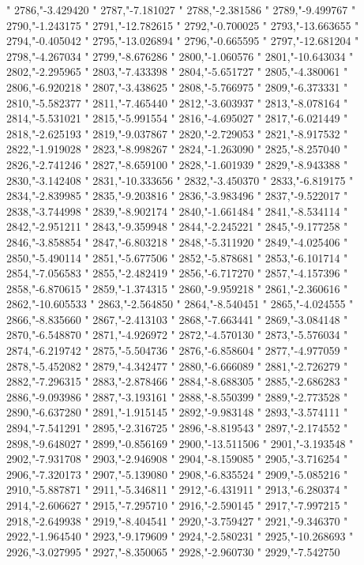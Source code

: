 "
2786,"-3.429420
"
2787,"-7.181027
"
2788,"-2.381586
"
2789,"-9.499767
"
2790,"-1.243175
"
2791,"-12.782615
"
2792,"-0.700025
"
2793,"-13.663655
"
2794,"-0.405042
"
2795,"-13.026894
"
2796,"-0.665595
"
2797,"-12.681204
"
2798,"-4.267034
"
2799,"-8.676286
"
2800,"-1.060576
"
2801,"-10.643034
"
2802,"-2.295965
"
2803,"-7.433398
"
2804,"-5.651727
"
2805,"-4.380061
"
2806,"-6.920218
"
2807,"-3.438625
"
2808,"-5.766975
"
2809,"-6.373331
"
2810,"-5.582377
"
2811,"-7.465440
"
2812,"-3.603937
"
2813,"-8.078164
"
2814,"-5.531021
"
2815,"-5.991554
"
2816,"-4.695027
"
2817,"-6.021449
"
2818,"-2.625193
"
2819,"-9.037867
"
2820,"-2.729053
"
2821,"-8.917532
"
2822,"-1.919028
"
2823,"-8.998267
"
2824,"-1.263090
"
2825,"-8.257040
"
2826,"-2.741246
"
2827,"-8.659100
"
2828,"-1.601939
"
2829,"-8.943388
"
2830,"-3.142408
"
2831,"-10.333656
"
2832,"-3.450370
"
2833,"-6.819175
"
2834,"-2.839985
"
2835,"-9.203816
"
2836,"-3.983496
"
2837,"-9.522017
"
2838,"-3.744998
"
2839,"-8.902174
"
2840,"-1.661484
"
2841,"-8.534114
"
2842,"-2.951211
"
2843,"-9.359948
"
2844,"-2.245221
"
2845,"-9.177258
"
2846,"-3.858854
"
2847,"-6.803218
"
2848,"-5.311920
"
2849,"-4.025406
"
2850,"-5.490114
"
2851,"-5.677506
"
2852,"-5.878681
"
2853,"-6.101714
"
2854,"-7.056583
"
2855,"-2.482419
"
2856,"-6.717270
"
2857,"-4.157396
"
2858,"-6.870615
"
2859,"-1.374315
"
2860,"-9.959218
"
2861,"-2.360616
"
2862,"-10.605533
"
2863,"-2.564850
"
2864,"-8.540451
"
2865,"-4.024555
"
2866,"-8.835660
"
2867,"-2.413103
"
2868,"-7.663441
"
2869,"-3.084148
"
2870,"-6.548870
"
2871,"-4.926972
"
2872,"-4.570130
"
2873,"-5.576034
"
2874,"-6.219742
"
2875,"-5.504736
"
2876,"-6.858604
"
2877,"-4.977059
"
2878,"-5.452082
"
2879,"-4.342477
"
2880,"-6.666089
"
2881,"-2.726279
"
2882,"-7.296315
"
2883,"-2.878466
"
2884,"-8.688305
"
2885,"-2.686283
"
2886,"-9.093986
"
2887,"-3.193161
"
2888,"-8.550399
"
2889,"-2.773528
"
2890,"-6.637280
"
2891,"-1.915145
"
2892,"-9.983148
"
2893,"-3.574111
"
2894,"-7.541291
"
2895,"-2.316725
"
2896,"-8.819543
"
2897,"-2.174552
"
2898,"-9.648027
"
2899,"-0.856169
"
2900,"-13.511506
"
2901,"-3.193548
"
2902,"-7.931708
"
2903,"-2.946908
"
2904,"-8.159085
"
2905,"-3.716254
"
2906,"-7.320173
"
2907,"-5.139080
"
2908,"-6.835524
"
2909,"-5.085216
"
2910,"-5.887871
"
2911,"-5.346811
"
2912,"-6.431911
"
2913,"-6.280374
"
2914,"-2.606627
"
2915,"-7.295710
"
2916,"-2.590145
"
2917,"-7.997215
"
2918,"-2.649938
"
2919,"-8.404541
"
2920,"-3.759427
"
2921,"-9.346370
"
2922,"-1.964540
"
2923,"-9.179609
"
2924,"-2.580231
"
2925,"-10.268693
"
2926,"-3.027995
"
2927,"-8.350065
"
2928,"-2.960730
"
2929,"-7.542750
